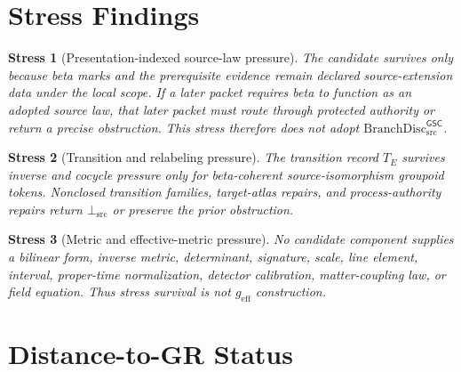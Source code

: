 \documentclass[11pt]{article}
\newcommand{\BranchDisc}{\mathrm{BranchDisc}_{\mathrm{src}}^{\mathsf{GSC}}}
\newcommand{\geff}{g_{\mathrm{eff}}}
\newcommand{\Bottom}{\bot_{\mathrm{src}}}
\newtheorem{stress}{Stress}
\begin{document}
\section{Stress Findings}

\begin{stress}[Presentation-indexed source-law pressure]
The candidate survives only because beta marks and the prerequisite evidence
remain declared source-extension data under the local scope. If a later packet
requires beta to function as an adopted source law, that later packet must
route through protected authority or return a precise obstruction. This stress
therefore does not adopt \(\BranchDisc\).
\end{stress}

\begin{stress}[Transition and relabeling pressure]
The transition record \(T_E\) survives inverse and cocycle pressure only for
beta-coherent source-isomorphism groupoid tokens. Nonclosed transition
families, target-atlas repairs, and process-authority repairs return
\(\Bottom\) or preserve the prior obstruction.
\end{stress}

\begin{stress}[Metric and effective-metric pressure]
No candidate component supplies a bilinear form, inverse metric, determinant,
signature, scale, line element, interval, proper-time normalization, detector
calibration, matter-coupling law, or field equation. Thus stress survival is
not \(\geff\) construction.
\end{stress}

\section{Distance-to-GR Status}
\end{document}
